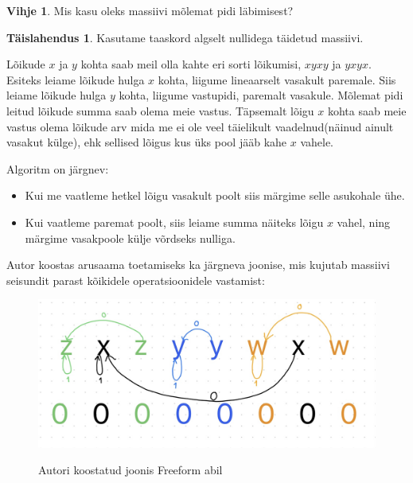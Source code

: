 \documentclass{trkut}
\theoremstyle{definition}
\newtheorem*{vihje}{Vihje}
\newtheorem*{solution}{Täislahendus}
\begin{document}
\begin{vihje}
Mis kasu oleks massiivi mõlemat pidi läbimisest?
\end{vihje}
\begin{solution}
Kasutame taaskord algselt nullidega täidetud massiivi.

Lõikude $x$ ja $y$ kohta saab meil olla kahte eri sorti lõikumisi, $xyxy$ ja $yxyx$.
Esiteks leiame lõikude hulga $x$ kohta, liigume lineaarselt vasakult paremale.
Siis leiame lõikude hulga $y$ kohta, liigume vastupidi, paremalt vasakule.
Mõlemat pidi leitud lõikude summa saab olema meie vastus.
Täpsemalt lõigu $x$ kohta saab meie vastus olema lõikude arv mida me ei ole veel täielikult vaadelnud(näinud ainult vasakut külge), ehk sellised lõigus kus üks pool jääb kahe $x$ vahele.

Algoritm on järgnev:
\begin{itemize}
\item Kui me vaatleme hetkel lõigu vasakult poolt siis märgime selle asukohale ühe.
\item Kui vaatleme paremat poolt, siis leiame summa näiteks lõigu $x$ vahel, ning märgime vasakpoole külje võrdseks nulliga.
\end{itemize}

Autor koostas arusaama toetamiseks ka järgneva joonise, mis kujutab massiivi seisundit parast kõikidele operatsioonidele vastamist:
\begin{figure}[H]%
    \includegraphics[width=12cm]{intersecting.jpeg}%
    \caption{Autori koostatud joonis Freeform abil}%
    \label{joonis}%
\end{figure}

\end{solution}
\end{document}
